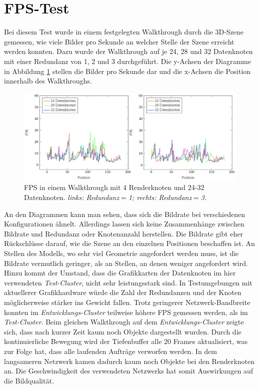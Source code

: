 \section{FPS-Test}
\label{sec:eval:fps}
Bei diesem Test wurde in einem festgelegten Walkthrough durch die 3D-Szene gemessen, wie viele Bilder pro Sekunde an welcher Stelle der Szene erreicht werden konnten. Dazu wurde der Walkthrough auf je 24, 28 und 32 Datenknoten mit einer Redundanz von 1, 2 und 3 durchgeführt. Die y-Achsen der Diagramme in Abbildung \ref{fig:eval:fps} stellen die Bilder pro Sekunde dar und die x-Achsen die Position innerhalb des Walkthroughs.
\begin{figure}
\centering
\includegraphics[scale=0.75]{images/diag_fps.pdf}
  \caption{\label{fig:eval:fps}FPS in einem Walkthrough mit 4 Renderknoten und 24-32 Datenknoten. \textit{links: Redundanz$=$1; rechts: Redundanz$=$3.}}
\end{figure}

An den Diagrammen kann man sehen, dass sich die Bildrate bei verschiedenen Konfigurationen ähnelt. Allerdings lassen sich keine Zusammenhänge zwischen Bildrate und Redundanz oder Knotenanzahl herstellen. Die Bildrate gibt eher Rückschlüsse darauf, wie die Szene an den einzelnen Positionen beschaffen ist. An Stellen des Modells, wo sehr viel Geometrie angefordert werden muss, ist die Bildrate vermutlich geringer, als an Stellen, an denen weniger angefordert wird. Hinzu kommt der Umstand, dass die Grafikkarten der Datenknoten im hier verwendeten \textit{Test-Cluster}, nicht sehr leistungsstark sind. In Testumgebungen mit aktuellerer Grafikhardware würde die Zahl der Redundanzen und der Knoten möglicherweise stärker ins Gewicht fallen. Trotz geringerer Netzwerk-Bandbreite konnten im \textit{Entwicklungs-Cluster} teilweise höhere FPS gemessen werden, als im \textit{Test-Cluster}. Beim gleichen Walkthrough auf dem \textit{Entwicklungs-Cluster} zeigte sich, dass nach kurzer Zeit kaum noch Objekte dargestellt wurden. Durch die kontinuierliche Bewegung wird der Tiefenbuffer alle 20 Frames aktualisiert, was zur Folge hat, dass alle laufenden Aufträge verworfen werden. In dem langsameren Netzwerk kamen dadurch kaum noch Objekte bei den Renderknoten an. Die Geschwindigkeit des verwendeten Netzwerks hat somit Auswirkungen auf die Bildqualität.

